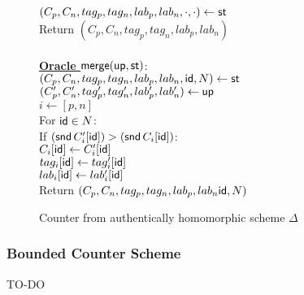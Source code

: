 \documentclass{article}
\begin{document}
\begin{figure}
{\begin{minipage}[t]{.44\linewidth}
	  $(C_p,C_n,tag_p,tag_n,lab_p,lab_n,\cdot,\cdot) \gets \mathsf{st}$\\
	  Return $(C_p,C_n,tag_p,tag_n,lab_p,lab_n)$\\
	  \\
       \underline{\bf Oracle $\mathsf{merge}(\mathsf{up},\mathsf{st})$}: \\
	  $(C_p,C_n,tag_p,tag_n,lab_p,lab_n,\mathsf{id},N) \gets \mathsf{st}$\\
	  $(C_p',C_n',tag_p',tag_n',lab_p',lab_n') \gets \mathsf{up}$\\
	  $i \gets [p,n]$\\
	  For $\mathsf{id} \in N$:\\
	  \phantom{x}If $(\mathsf{snd} \, C_i'[\mathsf{id}]) > (\mathsf{snd} \, C_i[\mathsf{id}])$: \\
	  \phantom{xx}$C_i[\mathsf{id}] \gets C_i'[\mathsf{id}]$\\
	  \phantom{xx}$tag_i[\mathsf{id}] \gets tag_i'[\mathsf{id}]$\\
	  \phantom{xx}$lab_i[\mathsf{id}] \gets lab_i'[\mathsf{id}]$\\
	  Return $(C_p,C_n,tag_p,tag_n,lab_p,lab_n\mathsf{id},N)$
     \end{minipage}
}
  \caption{Counter from authentically homomorphic scheme $\Delta$} 
  \label{fig.counterCRDT}
 \end{figure}


\subsubsection{Bounded Counter Scheme}

TO-DO

\end{document}
